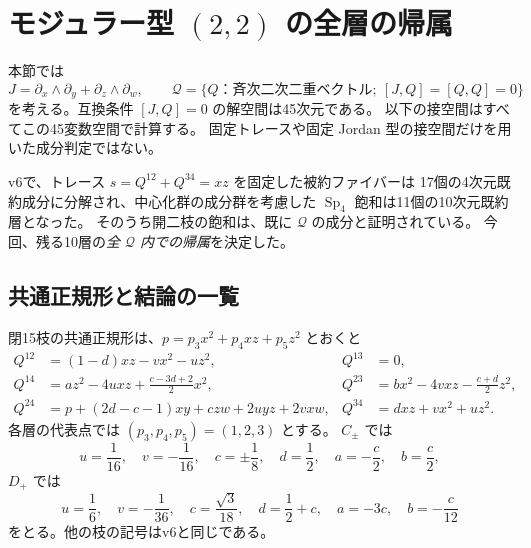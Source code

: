 \section{モジュラー型 \texorpdfstring{$(2,2)$}{(2,2)} の全層の帰属}

本節では
\[
 J=\partial_x\wedge\partial_y+\partial_z\wedge\partial_w,
 \qquad
 \mathcal Q=\{Q\text{：斉次二次二重ベクトル};\ [J,Q]=[Q,Q]=0\}
\]
を考える。互換条件 $[J,Q]=0$ の解空間は45次元である。
以下の接空間はすべてこの45変数空間で計算する。
固定トレースや固定 Jordan 型の接空間だけを用いた成分判定ではない。

v6で、トレース $s=Q^{12}+Q^{34}=xz$ を固定した被約ファイバーは
17個の4次元既約成分に分解され、中心化群の成分群を考慮した
$\operatorname{Sp}_4$ 飽和は11個の10次元既約層となった。
そのうち開二枝の飽和は、既に $\mathcal Q$ の成分と証明されている。
今回、残る10層の\emph{全 $\mathcal Q$ 内での帰属}を決定した。

\subsection{共通正規形と結論の一覧}

閉15枝の共通正規形は、$p=p_3x^2+p_4xz+p_5z^2$ とおくと
\begin{align*}
 Q^{12}&=(1-d)xz-vx^2-uz^2,&Q^{13}&=0,\\
 Q^{14}&=az^2-4uxz+\frac{c-3d+2}{2}x^2,
 &Q^{23}&=bx^2-4vxz-\frac{c+d}{2}z^2,\\
 Q^{24}&=p+(2d-c-1)xy+czw+2uyz+2vxw,
 &Q^{34}&=dxz+vx^2+uz^2.
\end{align*}
各層の代表点では $(p_3,p_4,p_5)=(1,2,3)$ とする。
$C_\pm$ では
\[
 u=\frac1{16},\quad v=-\frac1{16},\quad
 c=\pm\frac18,\quad d=\frac12,\quad a=-\frac c2,\quad b=\frac c2,
\]
$D_+$ では
\[
 u=\frac16,\quad v=-\frac1{36},\quad c=\frac{\sqrt3}{18},\quad
 d=\frac12+c,\quad a=-3c,\quad b=-\frac c{12}
\]
をとる。他の枝の記号はv6と同じである。

